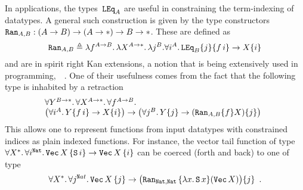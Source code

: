 In applications, the types~$\mathtt{LEq}_A$ are useful in constraining the
term-indexing of datatypes. %
A general such construction is given by the type constructors $\mathtt{Ran}_{A,B}:
(A\to B) \to (A\to*) \to B\to *$.  These are defined as 
\[
\mathtt{Ran}_{A,B}
\triangleq
\lambda f^{A\to B}.\,
  \lambda X^{A\to*}.\,
    \lambda j^B.
      \forall i^A.\,
        \mathtt{LEq}_B \{j\} \{f\,i\}
	  \to X\{i\}
\]
and are in spirit right Kan extensions, a notion that is being extensively
used in programming,~\eg~\cite{AbeMatUus05}. %
%
One of their usefulness comes from the fact that the following type
is inhabited by a retraction
\[
\!\!\!
\begin{array}{l}
\forall Y^{B\to*}.\,\forall X^{A\to*}.\,\forall f^{A\to B}.\,
\\
\big(\forall i^A.\,Y\{f\,i\}\to X\{i\}\big)
\to
\big(\forall j^B.\,Y\{j\}\to (\mathtt{Ran}_{A,B}\{f\} X)\{j\}\big)
\end{array}\]
This allows one to represent functions from input datatypes with
constrained indices as plain indexed functions.  For instance, the vector
tail function of type 
$\forall X^{*}.\,\forall i^{\mathtt{Nat}}.\,\mathtt{Vec}\, X\, \{\mathtt
S\, i\} \to \mathtt{Vec}\, X\,\{i\}$ can be coerced (forth and back) to one of
type 
\[
\forall X^{*}.\,\forall j^{\mathtt Nat}.\,\mathtt{Vec}\, X\, \{j\} \to
\big(\mathtt{Ran}_{\mathtt{Nat},\mathtt{Nat}}\,\{\lambda x.\,\mathtt S\,
x\}(\mathtt{Vec}\, X)\big)\{j\}
\enspace.
\]

